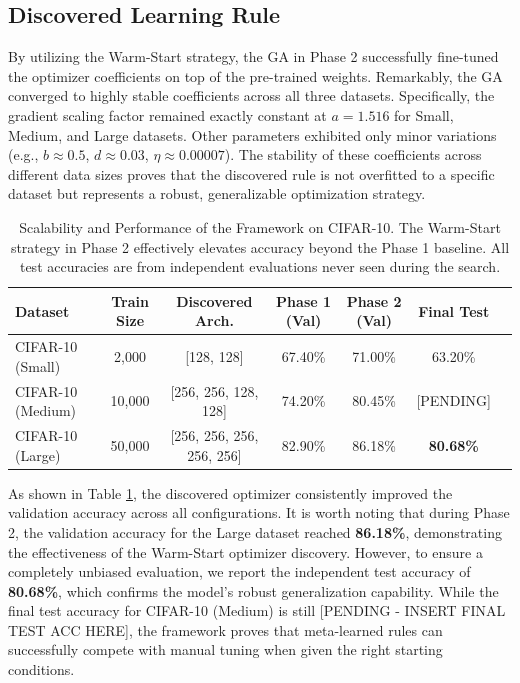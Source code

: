 \documentclass[sn-mathphys]{sn-jnl}%
\begin{document}
\subsection{Discovered Learning Rule}
By utilizing the Warm-Start strategy, the GA in Phase 2 successfully fine-tuned the optimizer coefficients on top of the pre-trained weights. Remarkably, the GA converged to highly stable coefficients across all three datasets. Specifically, the gradient scaling factor remained exactly constant at \textbf{\(a = 1.516\)} for Small, Medium, and Large datasets. Other parameters exhibited only minor variations (e.g., \(b \approx 0.5\), \(d \approx 0.03\), \(\eta \approx 0.00007\)). The stability of these coefficients across different data sizes proves that the discovered rule is not overfitted to a specific dataset but represents a robust, generalizable optimization strategy.

\begin{table}[htbp]
\caption{Scalability and Performance of the Framework on CIFAR-10. The Warm-Start strategy in Phase 2 effectively elevates accuracy beyond the Phase 1 baseline. All test accuracies are from independent evaluations never seen during the search.}\label{tab1}
\begin{tabular}{@{}lcccccc@{}}
\toprule
\textbf{Dataset} & \textbf{Train Size} & \textbf{Discovered Arch.} & \textbf{Phase 1 (Val)} & \textbf{Phase 2 (Val)} & \textbf{Final Test} \\ \midrule
CIFAR-10 (Small)  & 2,000 & [128, 128] & 67.40\% & 71.00\% & 63.20\% \\
CIFAR-10 (Medium) & 10,000 & [256, 256, 128, 128] & 74.20\% & 80.45\% & [PENDING] \\
CIFAR-10 (Large)  & 50,000 & [256, 256, 256, 256, 256] & 82.90\% & 86.18\% & \textbf{80.68\%} \\ \bottomrule
\end{tabular}
\end{table}

As shown in Table \ref{tab1}, the discovered optimizer consistently improved the validation accuracy across all configurations. It is worth noting that during Phase 2, the validation accuracy for the Large dataset reached \textbf{86.18\%}, demonstrating the effectiveness of the Warm-Start optimizer discovery. However, to ensure a completely unbiased evaluation, we report the independent test accuracy of \textbf{80.68\%}, which confirms the model's robust generalization capability. While the final test accuracy for CIFAR-10 (Medium) is still [PENDING - INSERT FINAL TEST ACC HERE], the framework proves that meta-learned rules can successfully compete with manual tuning when given the right starting conditions.
\end{document}

